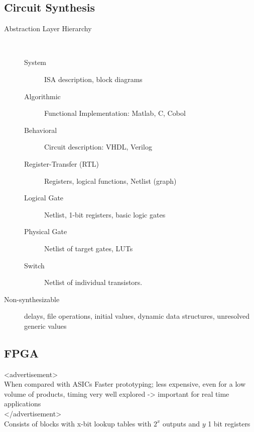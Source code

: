 \subsection{Circuit Synthesis}
\begin{description}
	\item[Abstraction Layer Hierarchy] \ 
	\begin{description}
		\item[System] ISA description, block diagrams
		\item[Algorithmic] Functional Implementation: Matlab, C, Cobol
		\item[Behavioral] Circuit description: VHDL, Verilog
		\item[Register-Transfer (RTL)] Registers, logical functions, Netlist (graph)
		\item[Logical Gate] Netlist, 1-bit registers, basic logic gates
		\item[Physical Gate] Netlist of target gates, \eg LUTs 
		\item[Switch] Netlist of individual transistors.
	\end{description}

	\item[Non-synthesizable] delays, file operations, initial values, dynamic data
	structures, unresolved generic values
\end{description}

\subsection{FPGA}
<advertisement> \\
When compared with ASICs
Faster prototyping; less expensive, even for a low volume of products, timing
very well explored -> important for real time applications \\
</advertisement>\\
Consists of blocks with x-bit lookup tables with $2^x$ outputs and $y$ 1 bit
registers
